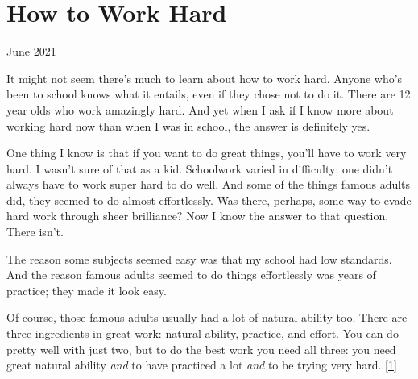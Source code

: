 \chapter{How to Work Hard}


            
              
                

June 2021

It might not seem there's much to learn
                  about how to work hard. Anyone who's been to school knows what
                  it entails, even if they chose not to do it. There are 12 year
                  olds who work amazingly hard. And yet when I ask if I know
                  more about working hard now than when I was in school, the
                  answer is definitely yes.

One thing I know is that
                  if you want to do great things, you'll have to work very hard.
                  I wasn't sure of that as a kid. Schoolwork varied in
                  difficulty; one didn't always have to work super hard to do
                  well. And some of the things famous adults did, they seemed to
                  do almost effortlessly. Was there, perhaps, some way to evade
                  hard work through sheer brilliance? Now I know the answer to
                  that question. There isn't.

The reason some
                  subjects seemed easy was that my school had low standards. And
                  the reason famous adults seemed to do things effortlessly was
                  years of practice; they made it look easy.

Of
                  course, those famous adults usually had a lot of natural
                  ability too. There are three ingredients in great work:
                  natural ability, practice, and effort. You can do pretty well
                  with just two, but to do the best work you need all three: you
                  need great natural ability \emph{and} to have practiced a lot
                  \emph{and} to be trying very hard.
                  [\href{\#f1n}{1}]

